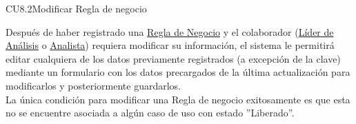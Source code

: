 	\begin{UseCase}{CU8.2}{Modificar Regla de negocio}{
			
				Después de haber registrado una \hyperlink{BREntidad}{Regla de Negocio} y el colaborador (\hyperlink{jefe}{Líder de Análisis} o \hyperlink{analista}{Analista}) requiera modificar su información, el sistema le permitirá editar cualquiera de los datos previamente registrados (a excepción de la clave) mediante un formulario con los datos precargados de la última actualización para modificarlos y posteriormente guardarlos.\\
				
			    La única condición para modificar una Regla de negocio exitosamente es que esta no se encuentre asociada a algún caso de uso con estado ”Liberado”.
		
	}
		

\end{UseCase}
